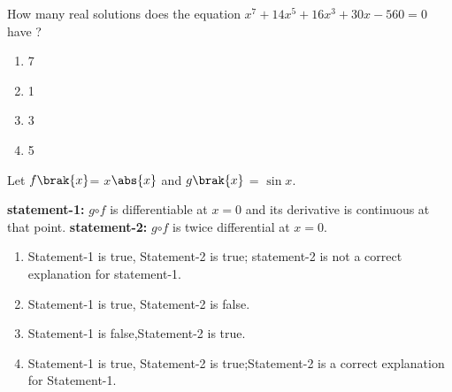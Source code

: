 \documentclass[journal,12pt,onecolumn]{IEEEtran}
\theoremstyle{remark}
\begin{document}
        
            
        \item How many real solutions does the equation $ x^7 + 14x^5 + 16x^3 + 30x- 560 = 0$ have ? \hfill{}
         \begin{multicols}{4}
        \begin{enumerate}
    
            
        
            \item 7
        \item 1
        \item 3
        \item 5
        
        \end{enumerate}
        \end{multicols}
            
        \item Let $f\brak{x}$= $x$$\abs{x}$ and $g\brak{x}$ = $\sin{x}$. 
       \begin{enumerate}
          
        
    \textbf{statement-1:}  $g$$\circ$$f$ is differentiable at $x=0$ and its derivative is continuous at that point. 
 \newline  \textbf{statement-2:  }$g$$\circ$$f$ is twice differential at $x=0$.  
                 \hfill{} 
                  
        
      \end{enumerate}
        \begin{enumerate}
        
            
        
            \item Statement-1 is true, Statement-2 is true; statement-2 is not a correct explanation for statement-1.  
            
        \item Statement-1 is true, Statement-2 is false.  
        \item Statement-1 is false,Statement-2 is true.  
        \item Statement-1 is true, Statement-2 is true;Statement-2 is a correct explanation for Statement-1.  

        \end{enumerate}
        
\end{document}
